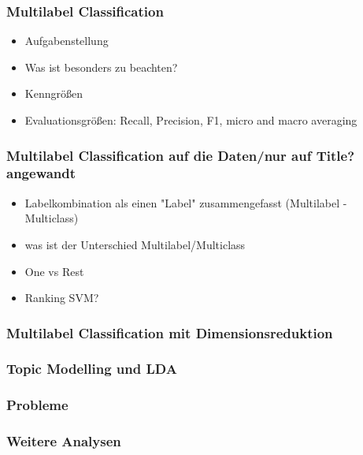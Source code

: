 \documentclass[12pt, xcolor=table]{beamer}
\begin{document}
\begin{frame}
	\frametitle{Multilabel Classification}
	\begin{itemize}
		\item Aufgabenstellung
		\item Was ist besonders zu beachten?
		\item Kenngrößen
        \item Evaluationsgrößen: Recall, Precision, F1, micro and macro averaging
	\end{itemize}
\end{frame}

\begin{frame}
	\frametitle{Multilabel Classification auf die Daten/nur auf Title? angewandt}
    \begin{itemize}
        \item Labelkombination als einen "Label" zusammengefasst (Multilabel - Multiclass)
        \item was ist der Unterschied Multilabel/Multiclass
        \item One vs Rest
        \item Ranking SVM?
    \end{itemize}
\end{frame}

\begin{frame}
	\frametitle{Multilabel Classification mit Dimensionsreduktion}
\end{frame}

\begin{frame}
    \frametitle{Topic Modelling und LDA}
\end{frame}

\begin{frame}
	\frametitle{Probleme}
\end{frame}

\begin{frame}
	\frametitle{Weitere Analysen}
\end{frame}
\end{document}
